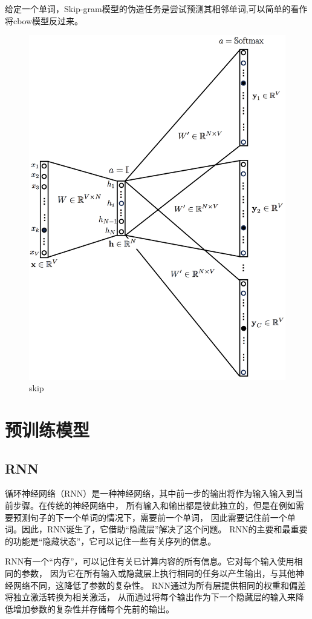 给定一个单词，Skip-gram模型的伪造任务是尝试预测其相邻单词,可以简单的看作将cbow模型反过来。

\begin{figure}[htbp]
  \centering
  \includegraphics[scale=0.15]{./images/skip.jpg}
  \caption{skip}
  \label{fig:skip}
\end{figure}

\section{预训练模型}

\subsection{RNN}

循环神经网络（RNN）是一种神经网络，其中前一步的输出将作为输入输入到当前步骤。在传统的神经网络中，
所有输入和输出都是彼此独立的，但是在例如需要预测句子的下一个单词的情况下，需要前一个单词，
因此需要记住前一个单词。因此，RNN诞生了，它借助“隐藏层”解决了这个问题。
RNN的主要和最重要的功能是“隐藏状态”，它可以记住一些有关序列的信息。

RNN有一个“内存”，可以记住有关已计算内容的所有信息。它对每个输入使用相同的参数，
因为它在所有输入或隐藏层上执行相同的任务以产生输出，与其他神经网络不同，这降低了参数的复杂性。
RNN通过为所有层提供相同的权重和偏差将独立激活转换为相关激活，
从而通过将每个输出作为下一个隐藏层的输入来降低增加参数的复杂性并存储每个先前的输出。